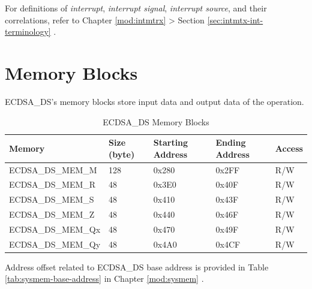 \documentclass[main\_\_EN.tex]{subfiles}
\begin{document}
\begin{tiplisting}
For definitions of \textit{interrupt}, \textit{interrupt signal}, \textit{interrupt source}, and their correlations, refer to Chapter \ref{mod:intmtrx} \textit{} > Section \ref{sec:intmtx-int-terminology} \textit{}.
\end{tiplisting}

\newpage
\section{Memory Blocks}

ECDSA\_DS's memory blocks store input data and output data of the operation.

\begin{table}[H]
    \centering
    \caption{ECDSA\_DS Memory Blocks} \label{tab:ecdsa-memory}
    \begin{threeparttable}
    \begin{tabular}{ | l | l | l | l | l | }
    \hline
        \rowcolor{lightgray}
        \textbf{Memory} & \textbf{Size (byte)}  &  \textbf{Starting Address}\tnote{*} &  \textbf{Ending Address} \tnote{*} & \textbf{Access}   \\ \hline
        ECDSA\_DS\_MEM\_M    & 128  & 0x280 & 0x2FF & R/W \\ \hline
        ECDSA\_DS\_MEM\_R    & 48   & 0x3E0 & 0x40F & R/W \\ \hline
        ECDSA\_DS\_MEM\_S    & 48   & 0x410 & 0x43F & R/W \\ \hline
        ECDSA\_DS\_MEM\_Z    & 48   & 0x440 & 0x46F & R/W \\ \hline
        ECDSA\_DS\_MEM\_Qx   & 48   & 0x470 & 0x49F & R/W \\ \hline
        ECDSA\_DS\_MEM\_Qy   & 48   & 0x4A0 & 0x4CF & R/W \\ \hline
    \end{tabular}
    \begin{tablenotes}
        \item[*] Address offset related to ECDSA\_DS base address is provided in Table \ref{tab:sysmem-base-address} in Chapter \ref{mod:sysmem} \textit{}.
    \end{tablenotes}
    \end{threeparttable}
\end{table}


\end{document}
